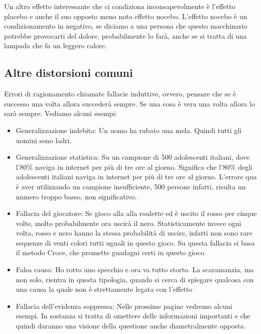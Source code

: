\documentclass[12pt]{book} %
\begin{document}
Un altro effetto interessante che ci condiziona inconsapevolmente è l'effetto placebo e anche il
suo opposto meno noto effetto nocebo. L'effetto nocebo è un condizionamento in negativo, se
diciamo a una persona che questo macchinario potrebbe provocarti del dolore, probabilmente lo farà, anche se si tratta
di una lampada che fa un leggero calore.


\bigskip

\subsection{Altre distorsioni comuni}
Errori di ragionamento chiamate fallacie induttive, ovvero, pensare che se è successo una volta allora succederà sempre.
Se una cosa è vera una volta allora lo sarà sempre. Vediamo alcuni esempi:

\begin{itemize}
\item Generalizzazione indebita: Un uomo ha rubato una mela. Quindi tutti gli uomini sono ladri.
\item Generalizzazione statistica: Su un campione di 500 adolescenti italiani, dove l'80\% naviga in internet per più di
tre ore al giorno. Significa che l'80\% degli adolescenti italiani naviga in internet per più di tre ore al giorno.
L'errore qua è aver utilizzando un campione insufficiente, 500 persone infatti, risulta un numero
troppo basso, non significativo.
\item Fallacia del giocatore: Se gioco alla alla roulette ed è uscito il rosso per cinque volte, molto probabilmente ora
uscirà il nero. Statisticamente invece ogni volta, rosso e nero hanno la stessa probabilità di uscire, infatti non sono
rare sequenze di venti colori tutti uguali in questo gioco. Su questa fallacia si basa il metodo Croce, che promette
guadagni certi in questo gioco.
\item Falsa causa: Ho rotto uno specchio e ora va tutto storto. La scaramanzia, ma non solo, rientra in questa
tipologia, quando si cerca di spiegare qualcosa con una causa la quale non è strettamente legata con
l'effetto
\item Fallacia dell'evidenza soppressa: Nelle prossime pagine vedremo alcuni esempi. In sostanza si tratta di omettere
delle informazioni importanti e che quindi daranno una visione della questione anche diametralmente opposta.
\end{itemize}

\bigskip
\end{document}
